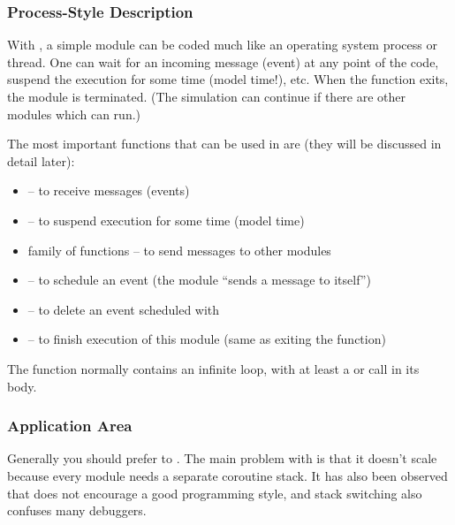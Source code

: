 \subsubsection{Process-Style Description}
\label{sec:simple-modules:activity:overview}

With , a simple module can be coded much like an
operating system process or thread. One can wait for an incoming message
(event) at any point of the code, suspend the execution for some time
(model time!), etc. When the  function exits, the module
is terminated.  (The simulation can continue if there are other modules
which can run.)

The most important functions that can be used in  are
(they will be discussed in detail later):
\begin{itemize}
\item {} -- to receive messages (events)
\item {} -- to suspend execution
    for some time (model time)
\item {} family of functions -- to send messages to other
    modules
\item {} -- to schedule an event (the module ``sends
    a message to itself'')
\item {} -- to delete an event scheduled with
\item {} -- to finish execution of this module (same as
    exiting the  function)
\end{itemize}

The  function normally contains an infinite loop,
with at least a  or  call in its body.



\subsubsection{Application Area}
\label{sec:simple-modules:activity:application-area}

Generally you should prefer  to .
The main problem with  is that it doesn't scale because
every module needs a separate coroutine stack. It has also been observed
that  does not encourage a good programming style, and
stack switching also confuses many debuggers.

